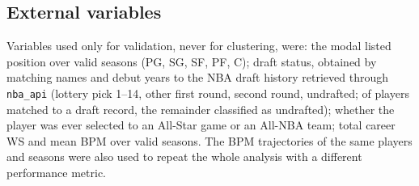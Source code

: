 \subsection{External variables}

Variables used only for validation, never for clustering, were: the modal listed position over valid seasons (PG, SG, SF, PF, C); draft status, obtained by matching names and debut years to the NBA draft history retrieved through \texttt{nba\_api} (lottery pick 1--14, other first round, second round, undrafted; \nDrafted{} of \nPlayers{} players matched to a draft record, the remainder classified as undrafted); whether the player was ever selected to an All-Star game or an All-NBA team; total career WS and mean BPM over valid seasons. The BPM trajectories of the same players and seasons were also used to repeat the whole analysis with a different performance metric.

